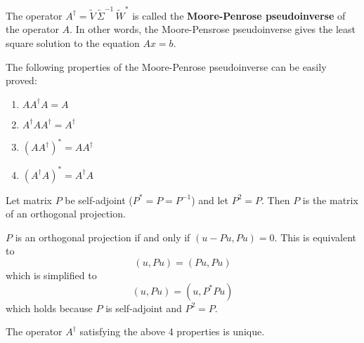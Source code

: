 \begin{definition}
The operator $A^{\dagger} = \widetilde{V} \, \widetilde{\Sigma}^{-1} \, \widetilde{W}^{*} $ is called the \textbf{Moore-Penrose pseudoinverse} of the operator $A$. In other words, the Moore-Pensrose pseudoinverse gives the least square solution to the equation $Ax = b$. 

The following properties of the Moore-Penrose pseudoinverse can be easily proved: 
\begin{enumerate}
	\item $AA^{\dagger}A = A$
	\item $A^{\dagger} A A^{\dagger} = A^{\dagger}$
	\item $(AA^{\dagger})^{*} = AA^{\dagger}$
	\item $(A^{\dagger} A)^{*} = A^{\dagger} A$
\end{enumerate}
\end{definition}

\begin{lemma}
Let matrix $P$ be self-adjoint ($P^{*} = P = P^{-1}$) and let $P^{2} = P$. Then $P$ is the matrix of an orthogonal projection.
\end{lemma}

\begin{lproof}
$P$ is an orthogonal projection if and only if $(u - Pu, Pu) = 0$. This is equivalent to 
$$(u, Pu) = (Pu, Pu)$$
which is simplified to 
$$(u, Pu) = (u, P^{*}Pu)$$
which holds because $P$ is self-adjoint and $P^{2} = P$. 
\end{lproof}

\begin{theorem}
The operator $A^{\dagger}$ satisfying the above 4 properties is unique. 
\end{theorem}

